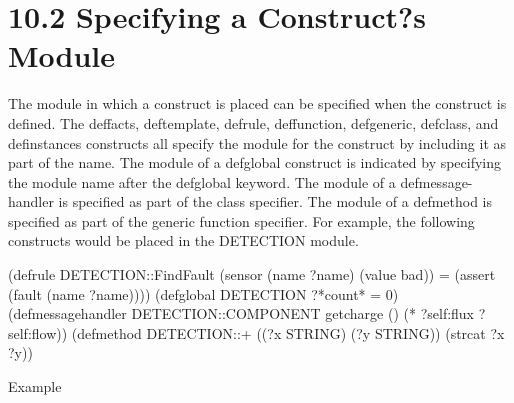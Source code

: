 \documentclass[letterpaper,10pt,english]{sphinxmanual}
\begin{document}
\section{10.2 Specifying a Construct?s Module}
\label{\detokenize{defmodule:specifying-a-construct-s-module}}
The module in which a construct is placed can be specified when the
construct is defined. The deffacts, deftemplate, defrule, deffunction,
defgeneric, defclass, and definstances constructs all specify the module
for the construct by including it as part of the name. The module of a
defglobal construct is indicated by specifying the module name after the
defglobal keyword. The module of a defmessage-handler is specified as
part of the class specifier. The module of a defmethod is specified as
part of the generic function specifier. For example, the following
constructs would be placed in the DETECTION module.

\begin{sphinxVerbatim}[commandchars=\\\{\}]
(defrule DETECTION::Find\PYGZhy{}Fault
  (sensor (name ?name) (value bad))
  =\PYGZgt{}
  (assert (fault (name ?name))))
  (defglobal DETECTION ?*count* = 0)
  (defmessage\PYGZhy{}handler DETECTION::COMPONENT get\PYGZhy{}charge ()
  (* ?self:flux ?self:flow))
  (defmethod DETECTION::+ ((?x STRING) (?y STRING))
  (str\PYGZhy{}cat ?x ?y))
\end{sphinxVerbatim}

Example

\begin{sphinxVerbatim}[commandchars=\\\{\}]
 
  
  
   
   
 
     
  
 
     
\end{sphinxVerbatim}
\end{document}

